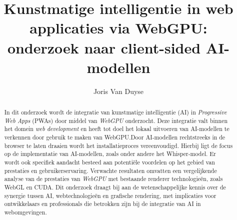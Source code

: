 \documentclass{hogent-article}
\title{Kunstmatige intelligentie in web applicaties via WebGPU: onderzoek naar client-sided AI-modellen}
\author{Joris Van Duyse}
\begin{document}
\begin{abstract}

In dit onderzoek wordt de integratie van kunstmatige intelligentie (AI) in \textit{Progressive Web Apps} (PWAs) door middel van \textit{WebGPU} onderzocht. Deze integratie valt binnen het domein \textit{web development} en heeft tot doel het lokaal uitvoeren van AI-modellen te verkennen door gebruik te maken van WebGPU.\@ Door AI-modellen rechtstreeks in de browser te laten draaien wordt het installatieproces vereenvoudigd. Hierbij ligt de focus op de implementatie van AI-modellen, zoals onder andere het Whisper-model. Er wordt ook specifiek aandacht besteed aan potentiële voordelen op het gebied van prestaties en gebruikerservaring. Verwachte resultaten omvatten een vergelijkende analyse van de prestaties van \textit{WebGPU} met bestaande renderer technologieën, zoals WebGL en CUDA. Dit onderzoek draagt bij aan de wetenschappelijke kennis over de synergie tussen AI, webtechnologieën en grafische rendering, met implicaties voor ontwikkelaars en professionals die betrokken zijn bij de integratie van AI in webomgevingen.
\end{abstract}

\tableofcontents



\printbibliography[heading=bibintoc]

\clearpage
\end{document}
